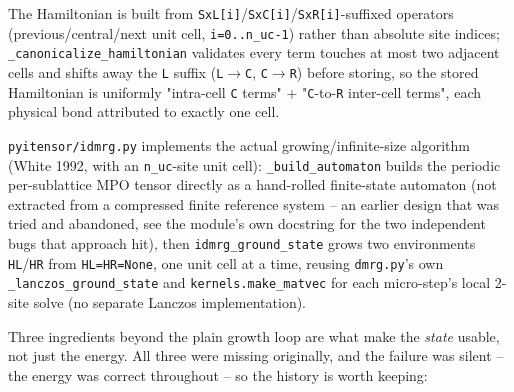 \documentclass[11pt]{article}
\begin{document}
The Hamiltonian is built from
\texttt{SxL[i]}/\texttt{SxC[i]}/\texttt{SxR[i]}-suffixed operators
(previous/central/next unit cell, \texttt{i=0..n\_uc-1}) rather than
absolute site indices; \texttt{\_canonicalize\_hamiltonian} validates
every term touches at most two adjacent cells and shifts away the
\texttt{L} suffix (\texttt{L}$\to$\texttt{C}, \texttt{C}$\to$\texttt{R})
before storing, so the stored Hamiltonian is uniformly "intra-cell
\texttt{C} terms" + "\texttt{C}-to-\texttt{R} inter-cell terms", each
physical bond attributed to exactly one cell.

\texttt{pyitensor/idmrg.py} implements the actual growing/infinite-size
algorithm (White 1992, with an \texttt{n\_uc}-site unit cell):
\texttt{\_build\_automaton} builds the periodic
per-sublattice MPO tensor directly as a hand-rolled finite-state
automaton (not extracted from a compressed finite reference system -- an
earlier design that was tried and abandoned, see the module's own
docstring for the two independent bugs that approach hit), then
\texttt{idmrg\_ground\_state} grows two environments \texttt{HL}/\texttt{HR}
from \texttt{HL=HR=None}, one unit cell at a time, reusing
\texttt{dmrg.py}'s own \texttt{\_lanczos\_ground\_state} and
\texttt{kernels.make\_matvec} for each micro-step's local 2-site solve
(no separate Lanczos implementation).

Three ingredients beyond the plain growth loop are what make the
\emph{state} usable, not just the energy. All three were missing
originally, and the failure was silent -- the energy was correct
throughout -- so the history is worth keeping:
\end{document}
